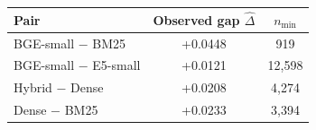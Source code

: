 \begin{tabular}{lSS}
\toprule
\textbf{Pair} & \textbf{Observed gap $\hat{\Delta}$} & \textbf{$n_{\min}$} \\
\midrule
BGE-small $-$ BM25 & +0.0448 & 919 \\
BGE-small $-$ E5-small & +0.0121 & 12,598 \\
Hybrid $-$ Dense & +0.0208 & 4,274 \\
Dense $-$ BM25 & +0.0233 & 3,394 \\
\bottomrule
\end{tabular}
